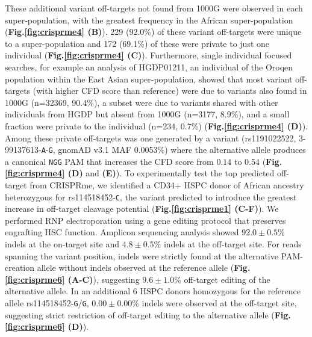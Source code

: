 \documentclass[a4paper, titlepage, openright]{book}
\begin{document}
These additional variant off-targets not found from 1000G were observed in each super-population, with the greatest frequency in the African super-population (\textbf{Fig.\ref{fig:crisprme4} (B)}). 229 (92.0\%) of these variant off-targets were unique to a super-population and 172 (69.1\%) of these were private to just one individual (\textbf{Fig.\ref{fig:crisprme4} (C)}). Furthermore, single individual focused searches, for example an analysis of HGDP01211, an individual of the Oroqen population within the East Asian super-population, showed that most variant off-targets (with higher CFD score than reference) were due to variants also found in 1000G (n=32369, 90.4\%), a subset were due to variants shared with other individuals from HGDP but absent from 1000G (n=3177, 8.9\%), and a small fraction were private to the individual (n=234, 0.7\%) (\textbf{Fig.\ref{fig:crisprme4} (D)}). Among these private off-targets was one generated by a variant (rs1191022522, 3-99137613-\texttt{A}-\texttt{G}, gnomAD v3.1 MAF 0.0053\%) where the alternative allele produces a canonical \texttt{NGG} PAM that increases the CFD score from $0.14$ to $0.54$ (\textbf{Fig.\ref{fig:crisprme4} (D)} and \textbf{(E)}). To experimentally test the top predicted off-target from CRISPRme, we identified a CD34+ HSPC donor of African ancestry heterozygous for rs114518452-\texttt{C}, the variant predicted to introduce the greatest increase in off-target cleavage potential (\textbf{Fig.\ref{fig:crisprme1} (C-F)}). We performed RNP electroporation using a gene editing protocol that preserves engrafting HSC function. Amplicon sequencing analysis showed $92.0 \pm 0.5\%$ indels at the on-target site and $4.8 \pm 0.5\%$ indels at the off-target site. For reads spanning the variant position, indels were strictly found at the alternative PAM-creation allele without indels observed at the reference allele (\textbf{Fig.\ref{fig:crisprme6} (A-C)}), suggesting $9.6 \pm 1.0\%$ off-target editing of the alternative allele. In an additional 6 HSPC donors homozygous for the reference allele rs114518452-\texttt{G}/\texttt{G}, $0.00 \pm 0.00\%$ indels were observed at the off-target site, suggesting strict restriction of off-target editing to the alternative allele (\textbf{Fig.\ref{fig:crisprme6} (D)}). 
\end{document}
